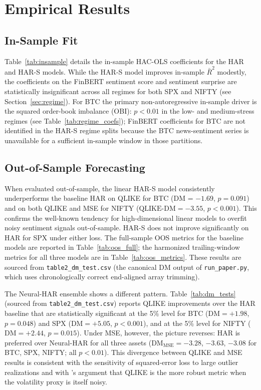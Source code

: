 \section{Empirical Results}
\label{sec:results}

\subsection{In-Sample Fit}
Table~\ref{tab:insample} details the in-sample HAC-OLS coefficients for the HAR and HAR-S models.
While the HAR-S model improves in-sample $\bar{R}^2$ modestly, the coefficients on the FinBERT
sentiment score and sentiment surprise are statistically insignificant across all regimes for both
SPX and NIFTY (see Section~\ref{sec:regime}). For BTC the primary non-autoregressive in-sample
driver is the squared order-book imbalance (OBI): $p < 0.01$ in the low- and medium-stress
regimes (see Table~\ref{tab:regime_coefs}); FinBERT coefficients for BTC are not identified in
the HAR-S regime splits because the BTC news-sentiment series is unavailable for a sufficient
in-sample window in those partitions.



\subsection{Out-of-Sample Forecasting}
\label{sub:oos}

When evaluated out-of-sample, the linear HAR-S model consistently underperforms the baseline HAR
on QLIKE for BTC (DM = $-1.69$, $p = 0.091$) and on both QLIKE and MSE for NIFTY
($\text{QLIKE-DM} = -3.55$, $p < 0.001$). This confirms the well-known tendency for
high-dimensional linear models to overfit noisy sentiment signals out-of-sample. HAR-S does not
improve significantly on HAR for SPX under either loss.  The full-sample OOS metrics for the
baseline models are reported in Table~\ref{tab:oos_full}; the harmonized trailing-window metrics
for all three models are in Table~\ref{tab:oos_metrics}. These results are sourced from
\texttt{table2\_dm\_test.csv} (the canonical DM output of \texttt{run\_paper.py}, which uses
chronologically correct end-aligned array trimming).

The Neural-HAR ensemble shows a different pattern. Table~\ref{tab:dm_tests} (sourced from
\texttt{table2\_dm\_test.csv}) reports QLIKE improvements over the HAR baseline that are
statistically significant at the 5\% level for BTC ($\text{DM} = +1.98$, $p = 0.048$) and SPX
($\text{DM} = +5.05$, $p < 0.001$), and at the 5\% level for NIFTY ($\text{DM} = +2.44$, $p =
0.015$). Under MSE, however, the picture reverses: HAR is preferred over Neural-HAR for all
three assets ($\text{DM}_{\text{MSE}} = -3.28$, $-3.63$, $-3.08$ for BTC, SPX, NIFTY; all
$p < 0.01$). This divergence between QLIKE and MSE results is consistent with the sensitivity
of squared-error loss to large outlier realizations and with \citet{patton2011volatility}'s
argument that QLIKE is the more robust metric when the volatility proxy is itself noisy.


